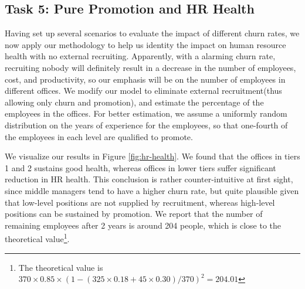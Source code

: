 \documentclass[tcn = 37075, sheet = false, abstract = false]{mcmthesis}
\begin{document}
\subsection{Task 5: Pure Promotion and HR Health}
Having set up several scenarios to evaluate the impact of different churn rates, we now apply our methodology to help us identity the impact on human resource health with no external recruiting. Apparently, with a alarming churn rate, recruiting nobody will definitely result in a decrease in the number of employees, cost, and productivity, so our emphasis will be on the number of employees in different offices. We modify our model to eliminate external recruitment(thus allowing only churn and promotion), and estimate the percentage of the employees in the offices. For better estimation, we assume a uniformly random distribution on the years of experience for the employees, so that one-fourth of the employees in each level are qualified to promote.

We visualize our results in Figure \ref{fig:hr-health}. We found that the offices in tiers 1 and 2 sustains good health, whereas offices in lower tiers suffer significant reduction in HR health. This conclusion is rather counter-intuitive at first sight, since middle managers tend to have a higher churn rate, but quite plausible given that low-level positions are not supplied by recruitment, whereas high-level positions can be sustained by promotion.
We report that the number of remaining employees after 2 years is around 204 people, which is close to the theoretical value\footnote{The theoretical value is $370 \times 0.85 \times (1 - (325 \times 0.18 + 45 \times 0.30) / 370 )^2 = 204.01$}.
\end{document}
